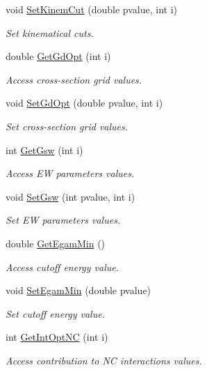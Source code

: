\begin{DoxyCompactItemize}
void \hyperlink{class_t_djangoh_acb1c8c1ead16a0fbadd733b117cc0445}{Set\+Kinem\+Cut} (double pvalue, int i)
\begin{DoxyCompactList}\small\item\em Set kinematical cuts. \end{DoxyCompactList}\item 
double \hyperlink{class_t_djangoh_a74a77949c408cc303ec5e90482b1e639}{Get\+Gd\+Opt} (int i)
\begin{DoxyCompactList}\small\item\em Access cross-\/section grid values. \end{DoxyCompactList}\item 
void \hyperlink{class_t_djangoh_abbbe8452bf4a894e8757e096fb104d90}{Set\+Gd\+Opt} (double pvalue, int i)
\begin{DoxyCompactList}\small\item\em Set cross-\/section grid values. \end{DoxyCompactList}\item 
int \hyperlink{class_t_djangoh_ac58587b988731552d41321364c30748d}{Get\+Gsw} (int i)
\begin{DoxyCompactList}\small\item\em Access EW parameters values. \end{DoxyCompactList}\item 
void \hyperlink{class_t_djangoh_acbd9827496878eed7768c97031a1c1d7}{Set\+Gsw} (int pvalue, int i)
\begin{DoxyCompactList}\small\item\em Set EW parameters values. \end{DoxyCompactList}\item 
double \hyperlink{class_t_djangoh_a47b4a219c93cbcad58a82bfab9649a42}{Get\+Egam\+Min} ()
\begin{DoxyCompactList}\small\item\em Access cutoff energy value. \end{DoxyCompactList}\item 
void \hyperlink{class_t_djangoh_ac296a00fee7971d387aa5127f726a649}{Set\+Egam\+Min} (double pvalue)
\begin{DoxyCompactList}\small\item\em Set cutoff energy value. \end{DoxyCompactList}\item 
int \hyperlink{class_t_djangoh_aea74b082287a6870a27b07217832768f}{Get\+Int\+Opt\+NC} (int i)
\begin{DoxyCompactList}\small\item\em Access contribution to NC interactions values. \end{DoxyCompactList}\item 

\end{DoxyCompactItemize}

